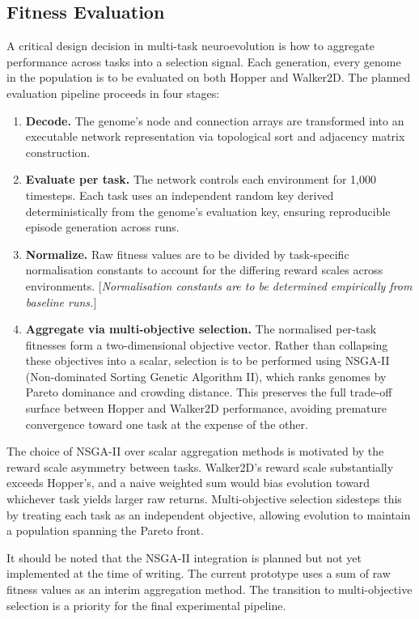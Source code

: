 \documentclass[12pt]{article}
\begin{document}
\subsection{Fitness Evaluation}

A critical design decision in multi-task neuroevolution is how to aggregate performance across tasks into a selection signal. Each generation, every genome in the population is to be evaluated on both Hopper and Walker2D. The planned evaluation pipeline proceeds in four stages:

\begin{enumerate}
    \item \textbf{Decode.} The genome's node and connection arrays are transformed into an executable network representation via topological sort and adjacency matrix construction.
    \item \textbf{Evaluate per task.} The network controls each environment for 1,000 timesteps. Each task uses an independent random key derived deterministically from the genome's evaluation key, ensuring reproducible episode generation across runs.
    \item \textbf{Normalize.} Raw fitness values are to be divided by task-specific normalisation constants to account for the differing reward scales across environments. [\textit{Normalisation constants are to be determined empirically from baseline runs.}]
    \item \textbf{Aggregate via multi-objective selection.} The normalised per-task fitnesses form a two-dimensional objective vector. Rather than collapsing these objectives into a scalar, selection is to be performed using NSGA-II (Non-dominated Sorting Genetic Algorithm II), which ranks genomes by Pareto dominance and crowding distance. This preserves the full trade-off surface between Hopper and Walker2D performance, avoiding premature convergence toward one task at the expense of the other.
\end{enumerate}

The choice of NSGA-II over scalar aggregation methods is motivated by the reward scale asymmetry between tasks. Walker2D's reward scale substantially exceeds Hopper's, and a naive weighted sum would bias evolution toward whichever task yields larger raw returns. Multi-objective selection sidesteps this by treating each task as an independent objective, allowing evolution to maintain a population spanning the Pareto front.

It should be noted that the NSGA-II integration is planned but not yet implemented at the time of writing. The current prototype uses a sum of raw fitness values as an interim aggregation method. The transition to multi-objective selection is a priority for the final experimental pipeline.
\end{document}
